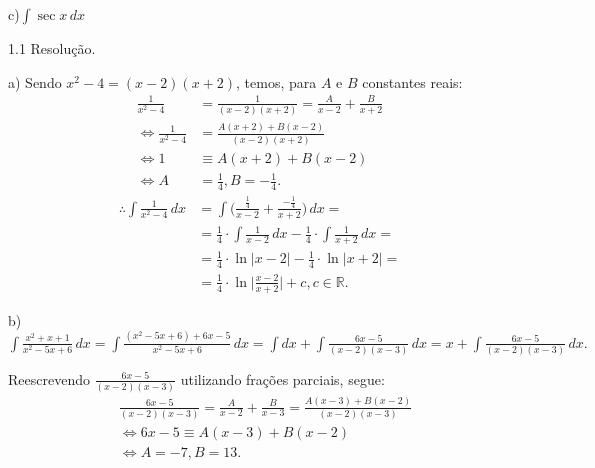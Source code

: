 \documentclass{article}
\begin{document}
{\begin{newpage}
\begin{multicols}{3}
c)$\displaystyle{\int \sec{x}\, dx}$
\end{multicols}
\par
\vspace{0.3cm}
\begin{flushleft}
1.1 Resolução.
\end{flushleft}
\par a) Sendo $x^2 - 4 = (x-2)(x+2)$, temos, para $A$ e $B$ constantes reais:
\begin{equation*}\displaystyle{\begin{split}
\frac{1}{x^2 - 4} &= \frac{1}{(x-2)(x+2)}=\frac{A}{x-2} + \frac{B}{x+2} \\
\Leftrightarrow \frac{1}{x^2 - 4} &= \frac{A(x+2) + B(x-2)}{(x-2)(x+2)} \\ \Leftrightarrow 1&\equiv A(x+2) + B(x-2) \\
\Leftrightarrow A&=\frac{1}{4}, B=-\frac{1}{4}.
\end{split}}\end{equation*}
$$\displaystyle{\begin{split}
\therefore \int \frac{1}{x^2 - 4}\, dx &= \int\Big( \frac{\frac{1}{4}}{x-2} + \frac{-\frac{1}{4}}{x+2}  \Big)\, dx = \\
&=\frac{1}{4}\cdot\int \frac{1}{x-2}\, dx-\frac{1}{4}\cdot\int \frac{1}{x+2}\, dx = \\
&=\frac{1}{4}\cdot\ln{|x-2|}-\frac{1}{4}\cdot\ln{|x+2|}= \\
&=\frac{1}{4}\cdot\ln{\Big|\frac{x-2}{x+2}\Big|}+ c, c\in\mathbb{R}.      \end{split}}$$ 
\par
\vspace{0.3cm}
b) $\displaystyle{\int \frac{x^2 + x + 1}{x^2 - 5x + 6}\, dx = \int \frac{(x^2 - 5x + 6) + 6x - 5}{x^2 - 5x + 6}\, dx = \int dx + \int \frac{6x - 5}{(x-2)(x-3)}\, dx = x + \int \frac{6x-5}{(x-2)(x-3)}\, dx}.$
\par\vspace{0.2cm}
Reescrevendo $\displaystyle{\frac{6x-5}{(x-2)(x-3)}}$ utilizando frações parciais, segue:
\begin{equation*}\displaystyle{\begin{split} &\frac{6x-5}{(x-2)(x-3)} = \frac{A}{x-2} + \frac{B}{x-3} = \frac{A(x-3) + B(x-2)}{(x-2)(x-3)}  \\ &\Leftrightarrow 6x-5\equiv A(x-3) + B(x-2) \\ &\Leftrightarrow A=-7, B=13.
\end{split}}\end{equation*}

\end{newpage}}
\end{document}
